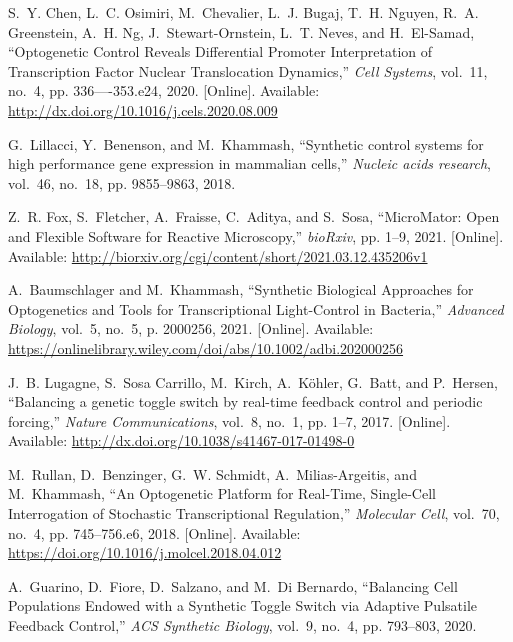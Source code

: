 \documentclass[12pt]{article}
\begin{document}
\begin{thebibliography}{10}
\BIBentryALTinterwordspacing
S.~Y. Chen, L.~C. Osimiri, M.~Chevalier, L.~J. Bugaj, T.~H. Nguyen, R.~A.
  Greenstein, A.~H. Ng, J.~Stewart-Ornstein, L.~T. Neves, and H.~El-Samad,
  ``{Optogenetic Control Reveals Differential Promoter Interpretation of
  Transcription Factor Nuclear Translocation Dynamics},'' \emph{Cell Systems},
  vol.~11, no.~4, pp. 336----353.e24, 2020. [Online]. Available:
  \url{http://dx.doi.org/10.1016/j.cels.2020.08.009}
\BIBentrySTDinterwordspacing

G.~Lillacci, Y.~Benenson, and M.~Khammash, ``{Synthetic control systems for
  high performance gene expression in mammalian cells},'' \emph{Nucleic acids
  research}, vol.~46, no.~18, pp. 9855--9863, 2018.

\BIBentryALTinterwordspacing
Z.~R. Fox, S.~Fletcher, A.~Fraisse, C.~Aditya, and S.~Sosa, ``{MicroMator: Open
  and Flexible Software for Reactive Microscopy},'' \emph{bioRxiv}, pp. 1--9,
  2021. [Online]. Available:
  \url{http://biorxiv.org/cgi/content/short/2021.03.12.435206v1}
\BIBentrySTDinterwordspacing

\BIBentryALTinterwordspacing
A.~Baumschlager and M.~Khammash, ``{Synthetic Biological Approaches for
  Optogenetics and Tools for Transcriptional Light-Control in Bacteria},''
  \emph{Advanced Biology}, vol.~5, no.~5, p. 2000256, 2021. [Online].
  Available:
  \url{https://onlinelibrary.wiley.com/doi/abs/10.1002/adbi.202000256}
\BIBentrySTDinterwordspacing

\BIBentryALTinterwordspacing
J.~B. Lugagne, S.~{Sosa Carrillo}, M.~Kirch, A.~K{\"{o}}hler, G.~Batt, and
  P.~Hersen, ``{Balancing a genetic toggle switch by real-time feedback control
  and periodic forcing},'' \emph{Nature Communications}, vol.~8, no.~1, pp.
  1--7, 2017. [Online]. Available:
  \url{http://dx.doi.org/10.1038/s41467-017-01498-0}
\BIBentrySTDinterwordspacing

\BIBentryALTinterwordspacing
M.~Rullan, D.~Benzinger, G.~W. Schmidt, A.~Milias-Argeitis, and M.~Khammash,
  ``{An Optogenetic Platform for Real-Time, Single-Cell Interrogation of
  Stochastic Transcriptional Regulation},'' \emph{Molecular Cell}, vol.~70,
  no.~4, pp. 745--756.e6, 2018. [Online]. Available:
  \url{https://doi.org/10.1016/j.molcel.2018.04.012}
\BIBentrySTDinterwordspacing

A.~Guarino, D.~Fiore, D.~Salzano, and M.~{Di Bernardo}, ``{Balancing Cell
  Populations Endowed with a Synthetic Toggle Switch via Adaptive Pulsatile
  Feedback Control},'' \emph{ACS Synthetic Biology}, vol.~9, no.~4, pp.
  793--803, 2020.


\end{thebibliography}
\end{document}
